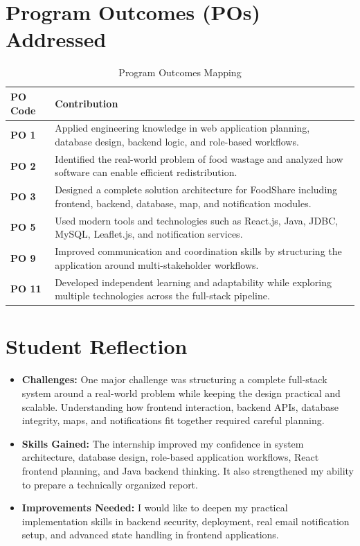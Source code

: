 \documentclass[12pt,a4paper]{report}
\newcommand{\projecttitle}{FoodShare}
\begin{document}
\chapter{Program Outcomes (POs) Addressed}

\begin{table}[H]
\centering
\caption{Program Outcomes Mapping}
\small
\renewcommand{\arraystretch}{1.5}
\begin{tabular}{@{} p{2cm} p{11cm} @{}}
\toprule
\textbf{PO Code} & \textbf{Contribution} \\
\midrule
\textbf{PO 1} & Applied engineering knowledge in web application planning, database design, backend logic, and role-based workflows. \\
\textbf{PO 2} & Identified the real-world problem of food wastage and analyzed how software can enable efficient redistribution. \\
\textbf{PO 3} & Designed a complete solution architecture for \projecttitle{} including frontend, backend, database, map, and notification modules. \\
\textbf{PO 5} & Used modern tools and technologies such as React.js, Java, JDBC, MySQL, Leaflet.js, and notification services. \\
\textbf{PO 9} & Improved communication and coordination skills by structuring the application around multi-stakeholder workflows. \\
\textbf{PO 11} & Developed independent learning and adaptability while exploring multiple technologies across the full-stack pipeline. \\
\bottomrule
\end{tabular}
\end{table}

\chapter{Student Reflection}
\begin{itemize}[leftmargin=1.2cm]
\item \textbf{Challenges:} One major challenge was structuring a complete full-stack system around a real-world problem while keeping the design practical and scalable. Understanding how frontend interaction, backend APIs, database integrity, maps, and notifications fit together required careful planning.

\item \textbf{Skills Gained:} The internship improved my confidence in system architecture, database design, role-based application workflows, React frontend planning, and Java backend thinking. It also strengthened my ability to prepare a technically organized report.

\item \textbf{Improvements Needed:} I would like to deepen my practical implementation skills in backend security, deployment, real email notification setup, and advanced state handling in frontend applications.
\end{itemize}
\end{document}
